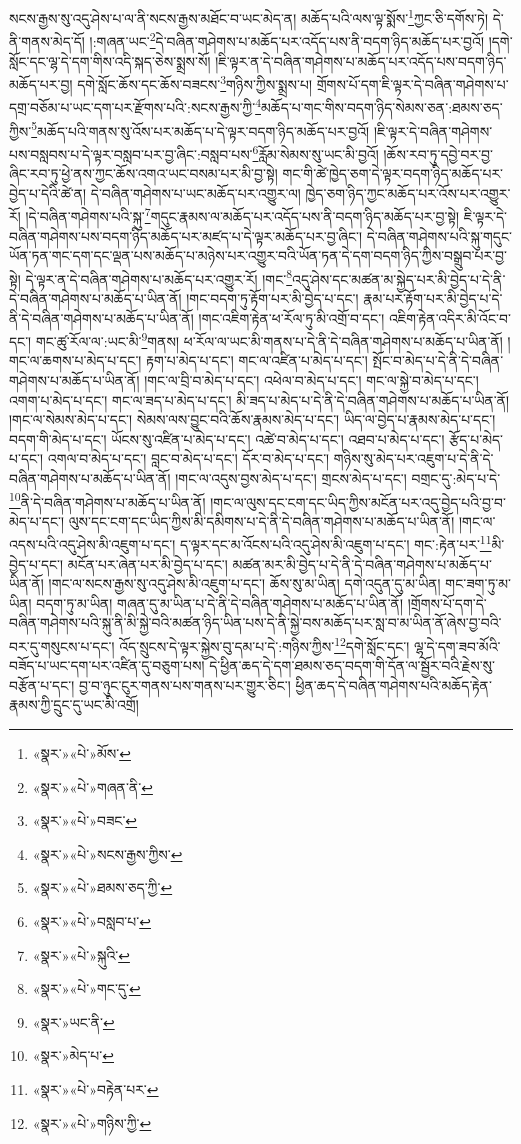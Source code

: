 སངས་རྒྱས་སུ་འདུ་ཤེས་པ་ལ་ནི་སངས་རྒྱས་མཐོང་བ་ཡང་མེད་ན། མཆོད་པའི་ལས་ལྟ་སྨོས་\footnote{«སྣར་»«པེ་»མོས་}ཀྱང་ཅི་དགོས་ཏེ། དེ་ནི་གནས་མེད་དོ། །:གཞན་ཡང་\footnote{«སྣར་»«པེ་»གཞན་ནི་}དེ་བཞིན་གཤེགས་པ་མཆོད་པར་འདོད་པས་ནི་བདག་ཉིད་མཆོད་པར་བྱའོ། །དགེ་སློང་དང་ལྷ་དེ་དག་གིས་འདི་སྐད་ཅེས་སྨྲས་སོ། །ཇི་ལྟར་ན་དེ་བཞིན་གཤེགས་པ་མཆོད་པར་འདོད་པས་བདག་ཉིད་མཆོད་པར་བྱ། དགེ་སློང་ཆོས་དང་ཆོས་བཟངས་\footnote{«སྣར་»«པེ་»བཟང་}གཉིས་ཀྱིས་སྨྲས་པ། གྲོགས་པོ་དག་ཇི་ལྟར་དེ་བཞིན་གཤེགས་པ་དགྲ་བཅོམ་པ་ཡང་དག་པར་རྫོགས་པའི་:སངས་རྒྱས་ཀྱི་\footnote{«སྣར་»«པེ་»སངས་རྒྱས་ཀྱིས་}མཆོད་པ་གང་གིས་བདག་ཉིད་སེམས་ཅན་:ཐམས་ཅད་ཀྱིས་\footnote{«སྣར་»«པེ་»ཐམས་ཅད་ཀྱི་}མཆོད་པའི་གནས་སུ་འོས་པར་མཆོད་པ་དེ་ལྟར་བདག་ཉིད་མཆོད་པར་བྱའོ། །ཇི་ལྟར་དེ་བཞིན་གཤེགས་པས་བསླབས་པ་དེ་ལྟར་བསླབ་པར་བྱ་ཞིང་:བསླབ་པས་\footnote{«སྣར་»«པེ་»བསླབ་པ་}རློམ་སེམས་སུ་ཡང་མི་བྱའོ། །ཆོས་རབ་ཏུ་དབྱེ་བར་བྱ་ཞིང་རབ་ཏུ་ཕྱེ་ནས་ཀྱང་ཆོས་འགའ་ཡང་བསམ་པར་མི་བྱ་སྟེ། གང་གི་ཚེ་ཁྱེད་ཅག་དེ་ལྟར་བདག་ཉིད་མཆོད་པར་བྱེད་པ་དེའི་ཚེ་ན། དེ་བཞིན་གཤེགས་པ་ཡང་མཆོད་པར་འགྱུར་ལ། ཁྱེད་ཅག་ཉིད་ཀྱང་མཆོད་པར་འོས་པར་འགྱུར་རོ། །དེ་བཞིན་གཤེགས་པའི་སྐུ་\footnote{«སྣར་»«པེ་»སྐུའི་}གདུང་རྣམས་ལ་མཆོད་པར་འདོད་པས་ནི་བདག་ཉིད་མཆོད་པར་བྱ་སྟེ། ཇི་ལྟར་དེ་བཞིན་གཤེགས་པས་བདག་ཉིད་མཆོད་པར་མཛད་པ་དེ་ལྟར་མཆོད་པར་བྱ་ཞིང་། དེ་བཞིན་གཤེགས་པའི་སྐུ་གདུང་ཡོན་ཏན་གང་དག་དང་ལྡན་པས་མཆོད་པ་མཉེས་པར་འགྱུར་བའི་ཡོན་ཏན་དེ་དག་བདག་ཉིད་ཀྱིས་བསྒྲུབ་པར་བྱ་སྟེ། དེ་ལྟར་ན་དེ་བཞིན་གཤེགས་པ་མཆོད་པར་འགྱུར་རོ། །གང་\footnote{«སྣར་»«པེ་»གང་དུ་}འདུ་ཤེས་དང་མཚན་མ་སྐྱེད་པར་མི་བྱེད་པ་དེ་ནི་དེ་བཞིན་གཤེགས་པ་མཆོད་པ་ཡིན་ནོ། །གང་བདག་ཏུ་རྟོག་པར་མི་བྱེད་པ་དང་། རྣམ་པར་རྟོག་པར་མི་བྱེད་པ་དེ་ནི་དེ་བཞིན་གཤེགས་པ་མཆོད་པ་ཡིན་ནོ། །གང་འཇིག་རྟེན་ཕ་རོལ་ཏུ་མི་འགྲོ་བ་དང་། འཇིག་རྟེན་འདིར་མི་འོང་བ་དང་། གང་ཚུ་རོལ་ལ་:ཡང་མི་\footnote{«སྣར་»ཡང་ནི་}གནས། ཕ་རོལ་ལ་ཡང་མི་གནས་པ་དེ་ནི་དེ་བཞིན་གཤེགས་པ་མཆོད་པ་ཡིན་ནོ། །གང་ལ་ཆགས་པ་མེད་པ་དང་། རྟག་པ་མེད་པ་དང་། གང་ལ་འཛིན་པ་མེད་པ་དང་། སྤོང་བ་མེད་པ་དེ་ནི་དེ་བཞིན་གཤེགས་པ་མཆོད་པ་ཡིན་ནོ། །གང་ལ་བྲི་བ་མེད་པ་དང་། འཕེལ་བ་མེད་པ་དང་། གང་ལ་སྐྱེ་བ་མེད་པ་དང་། འགག་པ་མེད་པ་དང་། གང་ལ་ཟད་པ་མེད་པ་དང་། མི་ཟད་པ་མེད་པ་དེ་ནི་དེ་བཞིན་གཤེགས་པ་མཆོད་པ་ཡིན་ནོ། །གང་ལ་སེམས་མེད་པ་དང་། སེམས་ལས་བྱུང་བའི་ཆོས་རྣམས་མེད་པ་དང་། ཡིད་ལ་བྱེད་པ་རྣམས་མེད་པ་དང་། བདག་གི་མེད་པ་དང་། ཡོངས་སུ་འཛིན་པ་མེད་པ་དང་། འཚེ་བ་མེད་པ་དང་། འཐབ་པ་མེད་པ་དང་། རྩོད་པ་མེད་པ་དང་། འགལ་བ་མེད་པ་དང་། བླང་བ་མེད་པ་དང་། དོར་བ་མེད་པ་དང་། གཉིས་སུ་མེད་པར་འཇུག་པ་དེ་ནི་དེ་བཞིན་གཤེགས་པ་མཆོད་པ་ཡིན་ནོ། །གང་ལ་འདུས་བྱས་མེད་པ་དང་། གྲངས་མེད་པ་དང་། བགྲང་དུ་:མེད་པ་དེ་\footnote{«སྣར་»མེད་པ་}ནི་དེ་བཞིན་གཤེགས་པ་མཆོད་པ་ཡིན་ནོ། །གང་ལ་ལུས་དང་ངག་དང་ཡིད་ཀྱིས་མངོན་པར་འདུ་བྱེད་པའི་བྱ་བ་མེད་པ་དང་། ལུས་དང་ངག་དང་ཡིད་ཀྱིས་མི་དམིགས་པ་དེ་ནི་དེ་བཞིན་གཤེགས་པ་མཆོད་པ་ཡིན་ནོ། །གང་ལ་འདས་པའི་འདུ་ཤེས་མི་འཇུག་པ་དང་། ད་ལྟར་དང་མ་འོངས་པའི་འདུ་ཤེས་མི་འཇུག་པ་དང་། གང་:རྟེན་པར་\footnote{«སྣར་»«པེ་»བརྟེན་པར་}མི་བྱེད་པ་དང་། མངོན་པར་ཞེན་པར་མི་བྱེད་པ་དང་། མཚན་མར་མི་བྱེད་པ་དེ་ནི་དེ་བཞིན་གཤེགས་པ་མཆོད་པ་ཡིན་ནོ། །གང་ལ་སངས་རྒྱས་སུ་འདུ་ཤེས་མི་འཇུག་པ་དང་། ཆོས་སུ་མ་ཡིན། དགེ་འདུན་དུ་མ་ཡིན། གང་ཟག་ཏུ་མ་ཡིན། བདག་ཏུ་མ་ཡིན། གཞན་དུ་མ་ཡིན་པ་དེ་ནི་དེ་བཞིན་གཤེགས་པ་མཆོད་པ་ཡིན་ནོ། །གྲོགས་པོ་དག་དེ་བཞིན་གཤེགས་པའི་སྐུ་ནི་མི་སྐྱེ་བའི་མཚན་ཉིད་ཡིན་པས་དེ་ནི་སྐྱེ་བས་མཆོད་པར་སླ་བ་མ་ཡིན་ནོ་ཞེས་བྱ་བའི་བར་དུ་གསུངས་པ་དང་། འོད་སྲུངས་དེ་ལྟར་སྐྱེས་བུ་དམ་པ་དེ་:གཉིས་ཀྱིས་\footnote{«སྣར་»«པེ་»གཉིས་ཀྱི་}དགེ་སློང་དང་། ལྷ་དེ་དག་ཟབ་མོའི་བཟོད་པ་ཡང་དག་པར་འཛིན་དུ་བཅུག་པས། དེ་ཕྱིན་ཆད་དེ་དག་ཐམས་ཅད་བདག་གི་དོན་ལ་སྦྱོར་བའི་རྗེས་སུ་བརྩོན་པ་དང་། བྱ་བ་ཉུང་ངུར་གནས་པས་གནས་པར་གྱུར་ཅིང་། ཕྱིན་ཆད་དེ་བཞིན་གཤེགས་པའི་མཆོད་རྟེན་རྣམས་ཀྱི་དྲུང་དུ་ཡང་མི་འགྲོ། 